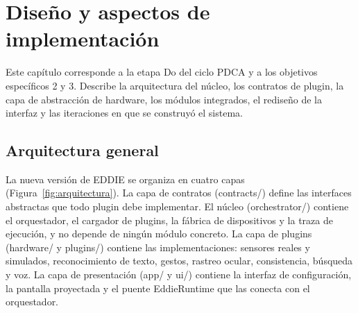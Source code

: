 \chapter{Diseño y aspectos de implementación}
\label{cap:diseno}

Este capítulo corresponde a la etapa Do del ciclo PDCA y a los objetivos específicos 2 y 3. Describe la arquitectura del núcleo, los contratos de plugin, la capa de abstracción de hardware, los módulos integrados, el rediseño de la interfaz y las iteraciones en que se construyó el sistema.

\section{Arquitectura general}

La nueva versión de EDDIE se organiza en cuatro capas (Figura~\ref{fig:arquitectura}). La capa de contratos (contracts/) define las interfaces abstractas que todo plugin debe implementar. El núcleo (orchestrator/) contiene el orquestador, el cargador de plugins, la fábrica de dispositivos y la traza de ejecución, y no depende de ningún módulo concreto. La capa de plugins (hardware/ y plugins/) contiene las implementaciones: sensores reales y simulados, reconocimiento de texto, gestos, rastreo ocular, consistencia, búsqueda y voz. La capa de presentación (app/ y ui/) contiene la interfaz de configuración, la pantalla proyectada y el puente EddieRuntime que las conecta con el orquestador.

